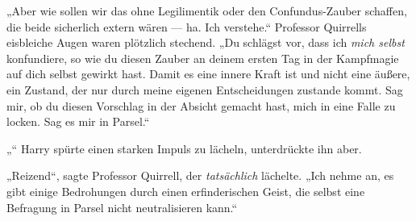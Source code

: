 „Aber wie sollen wir das ohne Legilimentik oder den Confundus-Zauber schaffen, die beide sicherlich extern wären — ha. Ich verstehe.“
Professor Quirrells eisbleiche Augen waren plötzlich stechend.
„Du schlägst vor, dass ich \emph{mich selbst} konfundiere, so wie du diesen Zauber an deinem ersten Tag in der Kampfmagie auf dich selbst gewirkt hast. Damit es eine innere Kraft ist und nicht eine äußere, ein Zustand, der nur durch meine eigenen Entscheidungen zustande kommt. Sag mir, ob du diesen Vorschlag in der Absicht gemacht hast, mich in eine Falle zu locken. Sag es mir in Parsel.“

„“
Harry spürte einen starken Impuls zu lächeln, unterdrückte ihn aber.

„Reizend“, sagte Professor Quirrell, der \emph{tatsächlich} lächelte.
„Ich nehme an, es gibt einige Bedrohungen durch einen erfinderischen Geist, die selbst eine Befragung in Parsel nicht neutralisieren kann.“

\later


